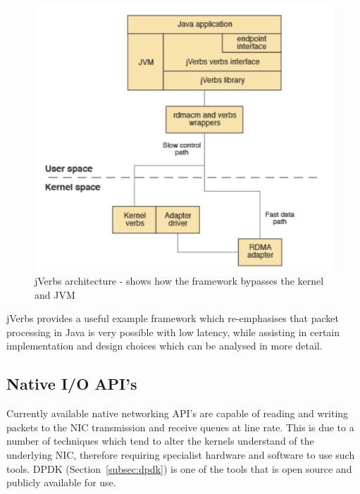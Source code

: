 \documentclass[interim_report.tex]{subfiles}
\begin{document}
\begin{figure}[H]
	\centering
	\includegraphics[width=\textwidth]{img/jverbs.png}
	\caption{jVerbs architecture - shows how the framework bypasses the kernel and JVM \cite{ibm_jverbs}}
	\label{fig:jverb}
\end{figure}

jVerbs provides a useful example framework which re-emphasises that packet processing in Java is very possible with low latency, while assisting in certain implementation and design choices which can be analysed in more detail. 

\subsection{Native I/O API's}
Currently available native networking API's are capable of reading and writing packets to the NIC transmission and receive queues at line rate. This is due to a number of techniques which tend to alter the kernels understand of the underlying NIC, therefore requiring specialist hardware and software to use such tools. DPDK (Section~\ref{subsec:dpdk}) is one of the tools that is open source and publicly available for use.
\end{document}
